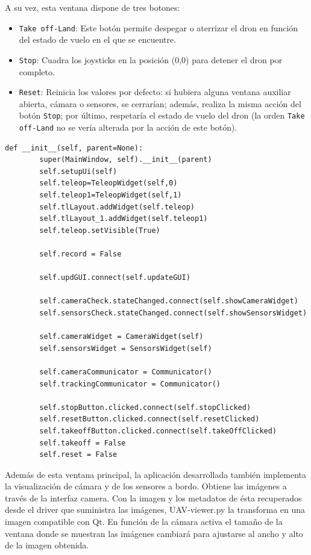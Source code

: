 A su vez, esta ventana dispone de tres botones:
\begin{itemize}
\item \texttt{Take off-Land}: Este botón permite despegar o aterrizar el dron en función del estado de vuelo en el que se encuentre.
\item \texttt{Stop}: Cuadra los joysticks en la posición (0,0) para detener el dron por completo.
\item \texttt{Reset}: Reinicia los valores por defecto: si hubiera alguna ventana auxiliar abierta, cámara o sensores, se cerrarían; además, realiza la misma acción del botón \texttt{Stop}; por último, respetaría el estado de vuelo del dron (la orden \texttt{Take off-Land} no se vería alterada por la acción de este botón).
\end{itemize}

\begin{lstlisting}[frame=single]
 def __init__(self, parent=None):
        super(MainWindow, self).__init__(parent)
        self.setupUi(self)
        self.teleop=TeleopWidget(self,0)
        self.teleop1=TeleopWidget(self,1)
        self.tlLayout.addWidget(self.teleop)
        self.tlLayout_1.addWidget(self.teleop1)
        self.teleop.setVisible(True)

        self.record = False

        self.updGUI.connect(self.updateGUI)

        self.cameraCheck.stateChanged.connect(self.showCameraWidget)
        self.sensorsCheck.stateChanged.connect(self.showSensorsWidget)

        self.cameraWidget = CameraWidget(self)
        self.sensorsWidget = SensorsWidget(self)

        self.cameraCommunicator = Communicator()
        self.trackingCommunicator = Communicator()

        self.stopButton.clicked.connect(self.stopClicked)
        self.resetButton.clicked.connect(self.resetClicked)
        self.takeoffButton.clicked.connect(self.takeOffClicked)
        self.takeoff = False
        self.reset = False
\end{lstlisting}

Además de esta ventana principal, la aplicación desarrollada también implementa la visualización de cámara y de los sensores a bordo. Obtiene las imágenes a través de la interfaz camera. Con la imagen y los metadatos de ésta recuperados desde el driver que suministra las imágenes, UAV-viewer.py la transforma en una imagen compatible con Qt. En función de la cámara activa el tamaño de la ventana donde se muestran las imágenes cambiará para ajustarse al ancho y alto de la imagen obtenida.

